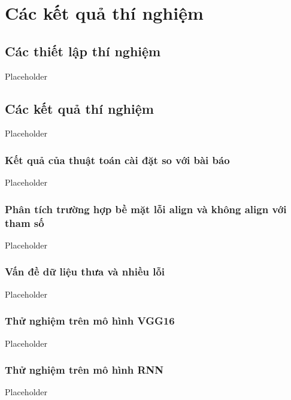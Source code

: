 \chapter{Các kết quả thí nghiệm}
\label{Chapter4}

\section{Các thiết lập thí nghiệm}

Placeholder

\section{Các kết quả thí nghiệm}

Placeholder

\subsection{Kết quả của thuật toán cài đặt so với bài báo}

Placeholder

\subsection{Phân tích trường hợp bề mặt lỗi align và không align với tham số}

Placeholder

\subsection{Vấn đề dữ liệu thưa và nhiều lỗi}

Placeholder

\subsection{Thử nghiệm trên mô hình VGG16}

Placeholder

\subsection{Thử nghiệm trên mô hình RNN}

Placeholder
